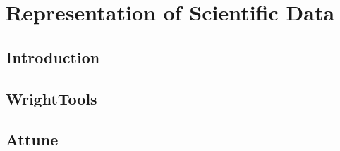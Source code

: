 \chapter{Representation of Scientific Data} \label{cha:rep}

\clearpage

\section{Introduction}  %

\clearpage

\section{WrightTools}  %

\section{Attune}  %

\clearpage

